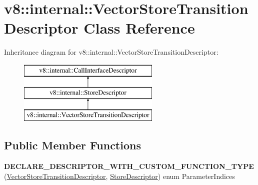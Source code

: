 \hypertarget{classv8_1_1internal_1_1_vector_store_transition_descriptor}{}\section{v8\+:\+:internal\+:\+:Vector\+Store\+Transition\+Descriptor Class Reference}
\label{classv8_1_1internal_1_1_vector_store_transition_descriptor}
Inheritance diagram for v8\+:\+:internal\+:\+:Vector\+Store\+Transition\+Descriptor\+:\begin{figure}[H]
\begin{center}
\leavevmode
\includegraphics[height=3.000000cm]{classv8_1_1internal_1_1_vector_store_transition_descriptor}
\end{center}
\end{figure}
\subsection*{Public Member Functions}
\begin{DoxyCompactItemize}
\item 
{\bfseries D\+E\+C\+L\+A\+R\+E\+\_\+\+D\+E\+S\+C\+R\+I\+P\+T\+O\+R\+\_\+\+W\+I\+T\+H\+\_\+\+C\+U\+S\+T\+O\+M\+\_\+\+F\+U\+N\+C\+T\+I\+O\+N\+\_\+\+T\+Y\+PE} (\hyperlink{classv8_1_1internal_1_1_vector_store_transition_descriptor}{Vector\+Store\+Transition\+Descriptor}, \hyperlink{classv8_1_1internal_1_1_store_descriptor}{Store\+Descriptor}) enum Parameter\+Indices\hypertarget{classv8_1_1internal_1_1_vector_store_transition_descriptor_a6f0062689dde5c9b69fe6948a7afdef4}{}\label{classv8_1_1internal_1_1_vector_store_transition_descriptor_a6f0062689dde5c9b69fe6948a7afdef4}

\end{DoxyCompactItemize}
